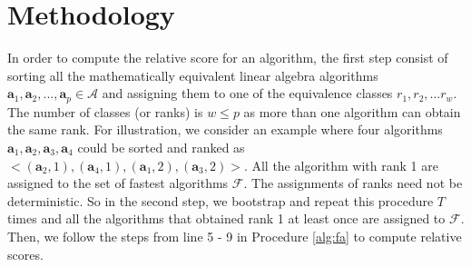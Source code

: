 \documentclass[conference]{IEEEtran}
\begin{document}
\section{Methodology}
\label{sec:met}

In order to compute the relative score for an algorithm, the first step consist of sorting all the mathematically equivalent linear algebra algorithms $\mathbf{a}_1,\mathbf{a}_2, ..., \mathbf{a}_p \in \mathcal{A}$ and assigning them to one of the equivalence classes $r_1, r_2, ...r_w$. The number of classes (or ranks) is $w \le p$ as more than one algorithm can obtain the same rank. For illustration, we consider an example where four algorithms $\mathbf{a}_1,\mathbf{a}_2, \mathbf{a}_3, \mathbf{a}_4$ could be sorted and ranked as $< (\mathbf{a}_2,1), (\mathbf{a}_4,1), (\mathbf{a}_1,2), (\mathbf{a}_3,2) >$. All the algorithm with rank 1 are assigned to the set of fastest algorithms $\mathcal{F}$. The assignments of ranks need not be deterministic. So in the second step, we bootstrap and repeat this procedure $T$ times and all the algorithms that obtained rank 1 at least once are assigned to $\mathcal{F}$. Then, we follow the steps from line 5 - 9 in Procedure \ref{alg:fa} to compute relative scores. 
\end{document}
